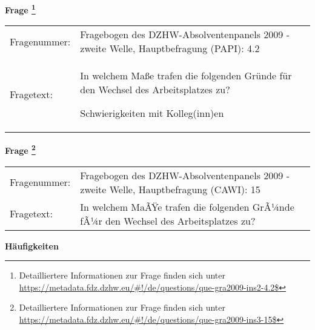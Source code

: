 				\vspace*{0.5cm}
                \noindent\textbf{Frage
	                \footnote{Detailliertere Informationen zur Frage finden sich unter
		              \url{https://metadata.fdz.dzhw.eu/\#!/de/questions/que-gra2009-ins2-4.2$}}}\\
				\begin{tabularx}{\hsize}{@{}lX}
					Fragenummer: &
					  Fragebogen des DZHW-Absolventenpanels 2009 - zweite Welle, Hauptbefragung (PAPI):
					  4.2
 \\
					Fragetext: & In welchem Maße trafen die folgenden Gründe für den Wechsel des Arbeitsplatzes zu?\par  Schwierigkeiten mit Kolleg(inn)en \\
				\end{tabularx}
				\vspace*{0.5cm}
                \noindent\textbf{Frage
	                \footnote{Detailliertere Informationen zur Frage finden sich unter
		              \url{https://metadata.fdz.dzhw.eu/\#!/de/questions/que-gra2009-ins3-15$}}}\\
				\begin{tabularx}{\hsize}{@{}lX}
					Fragenummer: &
					  Fragebogen des DZHW-Absolventenpanels 2009 - zweite Welle, Hauptbefragung (CAWI):
					  15
 \\
					Fragetext: & In welchem MaÃŸe trafen die folgenden GrÃ¼nde fÃ¼r den Wechsel des Arbeitsplatzes zu? \\
				\end{tabularx}





        		\vspace*{0.5cm}
                \noindent\textbf{Häufigkeiten}

